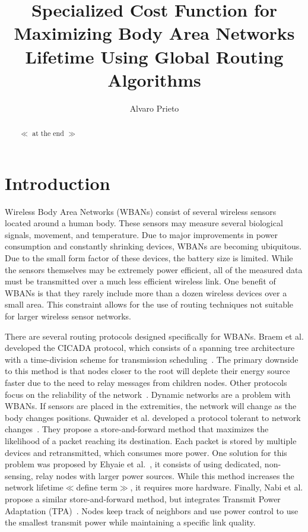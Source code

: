 \documentclass{article}
\begin{document}
\title{Specialized Cost Function for Maximizing Body Area Networks Lifetime Using Global Routing Algorithms}
\author{Alvaro Prieto}
\maketitle

\begin{abstract}
$\ll$ at the end $\gg$
\end{abstract}

\section{Introduction}
Wireless Body Area Networks (WBANs) consist of several wireless sensors located around a human body. These sensors may measure several biological signals, movement, and temperature. Due to major improvements in power consumption and constantly shrinking devices, WBANs are becoming ubiquitous. Due to the small form factor of these devices, the battery size is limited. While the sensors themselves may be extremely power efficient, all of the measured data must be transmitted over a much less efficient wireless link. One benefit of WBANs is that they rarely include more than a dozen wireless devices over a small area. This constraint allows for the use of routing techniques not suitable for larger wireless sensor networks.

There are several routing protocols designed specifically for WBANs. Braem et al. developed the CICADA protocol, which consists of a spanning tree architecture with a time-division scheme for transmission scheduling~\cite{protocol:CICADA}. The primary downside to this method is that nodes closer to the root will deplete their energy source faster due to the need to relay messages from children nodes. Other protocols focus on the reliability of the network~\cite{routing:storeandforward}. Dynamic networks are a problem with WBANs. If sensors are placed in the extremities, the network will change as the body changes positions. Quwaider et al. developed a protocol tolerant to network changes~\cite{routing:storeandforward}. They propose a store-and-forward method that maximizes the likelihood of a packet reaching its destination. Each packet is stored by multiple devices and retransmitted, which consumes more power. One solution for this problem was proposed by Ehyaie et al.~\cite{relay:networklife}, it consists of using dedicated, non-sensing, relay nodes with larger power sources. While this method increases the network lifetime$\ll$define term$\gg$, it requires more hardware. Finally, Nabi et al. propose a similar store-and-forward method, but integrates Transmit Power Adaptation (TPA)~\cite{relay:transmitpoweradaptation}. Nodes keep track of neighbors and use power control to use the smallest transmit power while maintaining a specific link quality.
\end{document}
